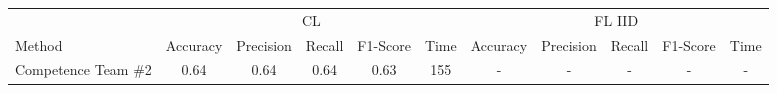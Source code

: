 \begin{table}[ht]
\begin{center}
\begin{adjustbox}{width=\textwidth}
\begin{tabular}{|l|*{5}{c}|*{5}{c}|}

\cline{1-11} & \multicolumn{5}{c|}{CL} & \multicolumn{5}{c|}{FL IID}       \\  \cline{2-11}
 Method & \multicolumn{1}{c|}{Accuracy} & \multicolumn{1}{c|}{Precision}& \multicolumn{1}{c|}{Recall}& \multicolumn{1}{c|}{F1-Score} & \multicolumn{1}{c|}{Time} & \multicolumn{1}{c|}{Accuracy} & \multicolumn{1}{c|}{Precision}& \multicolumn{1}{c|}{Recall}& \multicolumn{1}{c|}{F1-Score} & \multicolumn{1}{c|}{Time} \\ 
 \hline \hline
\multicolumn{1}{|l|}{Competence Team \#2 \cite{second_team}} & 0.64 & 0.64 & 0.64& 0.63 & 155 & - & - & - & - & - \\


\end{tabular}
\end{adjustbox}
\end{center}
\end{table}
